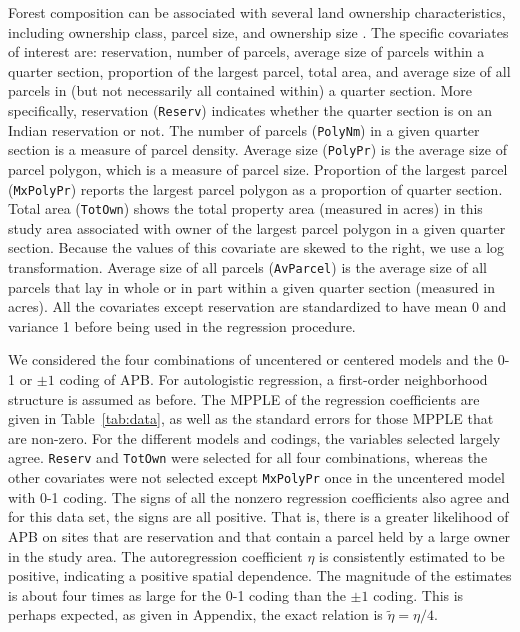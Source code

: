\documentclass[authoryear,review, 12pt]{elsarticle}
\begin{document}
Forest composition can be associated with several land ownership characteristics, including ownership class, parcel size, and ownership size \citep{crowh99, stanfieldb02}. The specific covariates of interest are: reservation, number of parcels, average size of parcels within a quarter section, proportion of the largest parcel, total area, and average size of all parcels in (but not necessarily all contained within) a quarter section.  More specifically, reservation ({\tt Reserv}) indicates whether the quarter section is on an Indian reservation or not.  The number of parcels ({\tt PolyNm}) in a given quarter section is a measure of parcel density.  Average size ({\tt PolyPr}) is the average size of parcel polygon, which is a measure of parcel size.  Proportion of the largest parcel ({\tt MxPolyPr}) reports the largest parcel polygon as a proportion of quarter section. Total area ({\tt TotOwn}) shows the total property area (measured in acres) in this study area associated with owner of the largest parcel polygon in a given quarter section.  Because the values of this covariate are skewed to the right, we use a log transformation.  Average size of all parcels ({\tt AvParcel}) is the average size of all parcels that lay in whole or in part within a given quarter section (measured in acres). All the covariates except reservation are standardized to have mean 0 and variance 1 before being used in the regression procedure. 

We considered the four combinations of uncentered or centered models and the 0-1 or $\pm 1$ coding of APB.  For autologistic regression, a first-order neighborhood structure is assumed as before.  The MPPLE of the regression coefficients are given in Table~\ref{tab:data}, as well as the standard errors for those MPPLE that are non-zero.  For the different models and codings, the variables selected largely agree.  {\tt Reserv} and {\tt TotOwn} were selected for all four combinations, whereas the other covariates were not selected except {\tt MxPolyPr} once in the uncentered model with 0-1 coding.  The signs of all the nonzero regression coefficients also agree and for this data set, the signs are all positive.  That is, there is a greater likelihood of APB on sites that are reservation and that contain a parcel held by a large owner in the study area.  The autoregression coefficient $\eta$ is consistently estimated to be positive, indicating a positive spatial dependence.  The magnitude of the estimates is about four times as large for the 0-1 coding than the $\pm 1$ coding.  This is perhaps expected, as given in Appendix, the exact relation is $\tilde{\eta}={\eta}/4$. 
\end{document}
